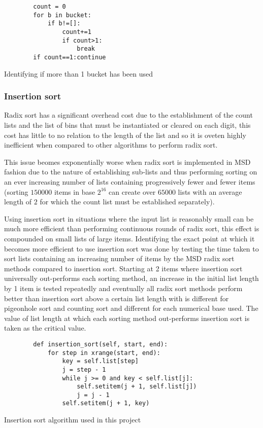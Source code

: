 \documentclass[12pt]{article}
\begin{document}
\begin{table}[H]
	\centering
	\begin{lstlisting}
		count = 0
		for b in bucket:
			if b!=[]:
				count+=1
				if count>1:
					break
		if count==1:continue
	\end{lstlisting}
	\caption*{Identifying if more than 1 bucket has been used}
\end{table}


\subsubsection{Insertion sort}
Radix sort has a significant overhead cost due to the establishment of the count lists and the list of bins that must be instantiated or cleared on each digit, this cost has little to no relation to the length of the list and so it is oveten highly inefficient when compared to other algorithms to perform radix sort.
\par
This issue beomes exponentially worse when radix sort is implemented in MSD fashion due to the nature of establishing sub-lists and thus performing sorting on an ever increasing number of lists containing progressively fewer and fewer items (sorting $150000$ items in base $2^{16}$ can create over $65000$ lists with an average length of $2$ for which the count list must be established separately).
\par
Using insertion sort in situations where the input list is reasonably small can be much more efficient than performing continuous rounds of radix sort, this effect is compounded on small lists of large items. Identifying the exact point at which it becomes more efficient to use insertion sort was done by testing the time taken to sort lists containing an increasing number of items by the MSD radix sort methods compared to insertion sort. Starting at 2 items where insertion sort universally out-performs each sorting method, an increase in the initial list length by 1 item is tested repeatedly and eventually all radix sort methods perform better than insertion sort above a certain list length with is different for pigeonhole sort and counting sort and different for each numerical base used. The value of list length at which each sorting method out-performs insertion sort is taken as the critical value. 
\begin{table}[H]
	\centering
	\begin{lstlisting}
        def insertion_sort(self, start, end):
            for step in xrange(start, end):
                key = self.list[step]
                j = step - 1
                while j >= 0 and key < self.list[j]:
                    self.setitem(j + 1, self.list[j])
                    j = j - 1
                self.setitem(j + 1, key)
	\end{lstlisting}
	\caption*{Insertion sort algorithm used in this project}
\end{table}
\end{document}
